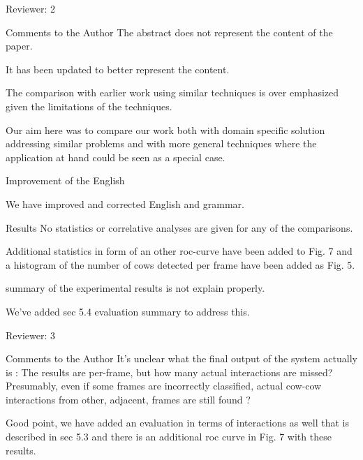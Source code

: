 \documentclass[10pt,a4paper]{letter}
\begin{document}
\begin{letter}{}
\begin{siderules}
Reviewer: 2

Comments to the Author
The abstract does not represent the content of the paper.
\end{siderules}

It has been updated to better represent the content.

\begin{siderules}
The comparison with earlier work using similar techniques is over emphasized given the limitations
of the techniques.
\end{siderules}

Our aim here was to compare our work both with domain specific solution addressing similar problems and with more general techniques where the application at hand could be seen as a special case.

\begin{siderules}
Improvement of the English
\end{siderules}

We have improved and corrected English and grammar.

\begin{siderules}
Results No statistics or correlative analyses are given for any of the comparisons.
\end{siderules}

Additional statistics in form of an other roc-curve have been added to Fig. 7 and a histogram of the number of cows detected per frame have been added as Fig. 5.

\begin{siderules}
summary of the experimental results is not explain properly.
\end{siderules}

We've added sec 5.4 evaluation summary to address this.

\begin{siderules}
Reviewer: 3

Comments to the Author
It's unclear what the final output of the system actually is : The results are per-frame, but how many actual interactions are missed? 
Presumably, even if some frames are incorrectly classified, actual cow-cow interactions from other, adjacent, frames are still found ?
\end{siderules}

Good point, we have added an evaluation in terms of interactions as well that is described in sec 5.3 and there is an additional roc curve in Fig. 7 with these results.


\end{letter}
\end{document}
